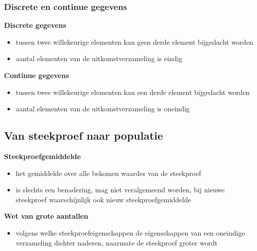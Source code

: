 \documentclass[titlepage]{article}
\numberwithin{equation}{section}
\begin{document}
\subsubsection{Discrete en continue gegevens}
\textbf{Discrete gegevens}
\begin{itemize}
	\item tussen twee willekeurige elementen kan geen derde element bijgedacht worden
	\item aantal elementen van de uitkomstverzameling is eindig
\end{itemize}
\textbf{Continue gegevens}
\begin{itemize}
	\item tussen twee willekeurige elementen kan een derde element bijgedacht worden
	\item aantal elementen van de uitkomstverzameling is oneindig
\end{itemize}
\subsection{Van steekproef naar populatie}
\textbf{Steekproefgemiddelde}
\begin{itemize}
	\item het gemiddelde over alle bekomen waardes van de steekproef
	\item is slechts een benadering, mag niet veralgemeend worden, bij nieuwe steekproef waarschijnlijk ook nieuw steekproefgemiddelde
\end{itemize}
\textbf{Wet van grote aantallen}
\begin{itemize}
	\item volgens welke steekproefeigenschappen de eigenschappen van een oneindige verzameling dichter naderen, naarmate de steekproef groter wordt
\end{itemize}
\end{document}
